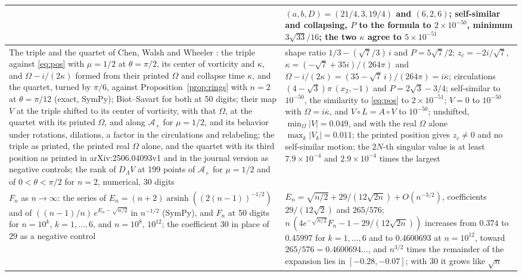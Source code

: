 \documentclass[11pt]{article}
\theoremstyle{definition}
\newcommand{\Ap}{\mathcal{A}_+}
\begin{document}
{\begin{longtable}{|>{\raggedright\arraybackslash}p{}|>{\raggedright\arraybackslash}p{}|}
    & $(a, b, D) = (21/4, 3, 19/4)$ and $(6, 2, 6)$; self-similar and collapsing, $P$ to the formula to $2 \times 10^{-50}$, minimum $3\sqrt{33}/16$; the two $\kappa$ agree to $5 \times 10^{-51}$ \\ \hline
  The triple and the quartet of Chen, Walsh and Wheeler \cite[Eqs.~(4.5), (4.6)]{cww2026}: the triple against \eqref{eq:pos} with $\mu = 1/2$ at $\theta = \pi/2$, its center of vorticity and $\kappa$, and $\Omega - i/(2\kappa)$ formed from their printed $\Omega$ and collapse time $\kappa$, and the quartet, turned by $\pi/6$, against Proposition~\ref{prop:rings} with $n = 2$ at $\theta = \pi/12$ (exact, SymPy); Biot--Savart for both at 50 digits; their map $V$ \cite[Eq.~(4.4)]{cww2026} at the triple shifted to its center of vorticity, with that $\Omega$, at the quartet with its printed $\Omega$, and along $\Ap$ for $\mu = 1/2$, and its behavior under rotations, dilations, a factor in the circulations and relabeling; the triple as printed, the printed real $\Omega$ alone, and the quartet with its third position as printed in arXiv:2506.04093v1 and in the journal version as negative controls; the rank of $D_\Lambda V$ at 199 points of $\Ap$ for $\mu = 1/2$ and of $0 < \theta < \pi/2$ for $n = 2$, numerical, 30 digits
    & shape ratio $1/3 - (\sqrt{7}/3)\,i$ and $P = 5\sqrt{7}/2$; $z_c = -2i/\sqrt{7}$, $\kappa = (-\sqrt{7} + 35i)/(264\pi)$ and $\Omega - i/(2\kappa) = (35 - \sqrt{7}\,i)/(264\pi) = i\overline{\kappa}$; circulations $(4 - \sqrt{3})\pi\,(x_2, -1)$ and $P = 2\sqrt{3} - 3/4$; self-similar to $10^{-50}$, the similarity to \eqref{eq:pos} to $2 \times 10^{-51}$; $V = 0$ to $10^{-50}$ with $\Omega = i\overline{\kappa}$, and $V \circ L = A \circ V$ to $10^{-50}$; unshifted, $\min_\Omega |V| = 0.049$, and with the real $\Omega$ alone $\max_k |V_k| = 0.011$; the printed position gives $z_c \ne 0$ and no self-similar motion; the $2N$-th singular value is at least $7.9 \times 10^{-4}$ and $2.9 \times 10^{-4}$ times the largest \\ \hline
  $F_n$ as $n \to \infty$: the series of $E_n = (n + 2)\operatorname{arsinh}((2(n - 1))^{-1/2})$ and of $((n - 1)/n)\,e^{E_n - \sqrt{n/2}}$ in $n^{-1/2}$ (SymPy), and $F_n$ at 50 digits for $n = 10^k$, $k = 1, \dots, 6$, and $n = 10^8$, $10^{12}$; the coefficient $30$ in place of $29$ as a negative control
    & $E_n = \sqrt{n/2} + 29/(12\sqrt{2n}) + O(n^{-3/2})$, coefficients $29/(12\sqrt{2})$ and $265/576$; $n\,(4e^{-\sqrt{n/2}}F_n - 1 - 29/(12\sqrt{2n}))$ increases from $0.374$ to $0.45997$ for $k = 1, \dots, 6$ and to $0.4600693$ at $n = 10^{12}$, toward $265/576 = 0.4600694\ldots$, and $n^{3/2}$ times the remainder of the expansion lies in $[-0.28, -0.07]$; with $30$ it grows like $\sqrt{n}$ \\ \hline

\end{longtable}}
\end{document}
